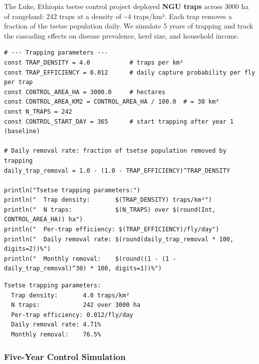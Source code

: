 The Luke, Ethiopia tsetse control project deployed \textbf{NGU traps} across 3000 ha of rangeland: 242 traps at a density of {\textasciitilde}4 traps/km². Each trap removes a fraction of the tsetse population daily. We simulate 5 years of trapping and track the cascading effects on disease prevalence, herd size, and household income.




\begin{verbatim}
# --- Trapping parameters ---
const TRAP_DENSITY = 4.0           # traps per km²
const TRAP_EFFICIENCY = 0.012      # daily capture probability per fly per trap
const CONTROL_AREA_HA = 3000.0     # hectares
const CONTROL_AREA_KM2 = CONTROL_AREA_HA / 100.0  # = 30 km²
const N_TRAPS = 242
const CONTROL_START_DAY = 365      # start trapping after year 1 (baseline)

# Daily removal rate: fraction of tsetse population removed by trapping
daily_trap_removal = 1.0 - (1.0 - TRAP_EFFICIENCY)^TRAP_DENSITY

println("Tsetse trapping parameters:")
println("  Trap density:       $(TRAP_DENSITY) traps/km²")
println("  N traps:            $(N_TRAPS) over $(round(Int, CONTROL_AREA_HA)) ha")
println("  Per-trap efficiency: $(TRAP_EFFICIENCY)/fly/day")
println("  Daily removal rate: $(round(daily_trap_removal * 100, digits=2))%")
println("  Monthly removal:    $(round((1 - (1 - daily_trap_removal)^30) * 100, digits=1))%")
\end{verbatim}




\begin{verbatim}
Tsetse trapping parameters:
  Trap density:       4.0 traps/km²
  N traps:            242 over 3000 ha
  Per-trap efficiency: 0.012/fly/day
  Daily removal rate: 4.71%
  Monthly removal:    76.5%
\end{verbatim}



\subsubsection{Five-Year Control Simulation}



\label{4691263182509456791}{}



